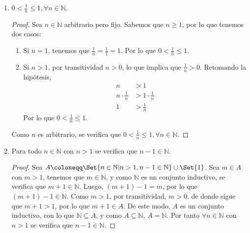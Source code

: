 \documentclass[11pt]{article}
\newcommand{\N}{\mathbb{N}}
\newcommand{\R}{\mathbb{R}}
\newcommand{\bfit}[1]{\textbf{\textit{#1}}}
\let\emptyset\varnothing
\let\set\Set
\let\union\cup
\begin{document}
\begin{enumerate}[label=\alph*)]
\begin{proof}
        Si $n\in A$ debe ser el caso que $n\in \N$ y $1\leq n$. Además, por la cerradura de la suma en $\N$, $n+1\in \N$. Luego, $0 \leq 1$ de donde sigue que $n \leq n+1$. Por transitividad, $1\leq n+1$, por lo que $n+1\in A$, lo que implica que $A$ es un conjunto inductivo, es decir, $\N\subseteq A$ y como $A\subseteq \N$, $A=N$. En otras palabras, $n\geq 1, \forall n\in\N$.
    \end{proof} \vspace{-1em}

    \bfit{Definición:}  Sea $A\subseteq \R$ con $A \neq \emptyset$, decimos que $m$ es elemento mínimo de $A$ si $m\in A$ y $m\leq a, \forall a\in A$.

    \item $0<\frac{1}{n}\leq 1, \forall n\in \N$.
    \vspace{-1em}\begin{proof} 
        Sea $n\in \N$ arbitrario pero fijo. Sabemos que $n\geq 1$, por lo que tenemos dos casos: \begin{enumerate}[label=\roman*)]
            \item Si $n=1$, tenemos que $\frac{1}{n}=\frac{1}{1}=1$. Por lo que $0<\frac{1}{n}\leq 1$.
            \item Si $n>1$, por transitividad $n>0$, lo que implica que $\frac{1}{n}>0$. Retomando la hipótesis, \begin{align*}
                n &> 1\\
                n \cdot \frac{1}{n} &> 1\cdot \frac{1}{n}\\
                1 &> \frac{1}{n}
            \end{align*} Por lo que $0<\frac{1}{n}\leq 1$. 
        \end{enumerate} Como $n$ es arbitrario, se verifica que $0<\frac{1}{n}\leq 1, \forall n\in \N$.
    \end{proof} \vspace{-1em}

    \item Para todo $n\in \N$ con $n>1$ se verifica que $n-1\in \N$.
    \vspace{-1em}\begin{proof} 
        Sea $A \coloneqq \set{n\in \N | n>1, n-1\in \N}\union \set{1}$. Sea $m\in A$ con $m>1$, tenemos que $m\in \N$, y como $\N$ es un conjunto inductivo, se verifica que $m+1\in\N$. Luego, $(m+1)-1=m$, por lo que $(m+1)-1\in \N$. Como $m>1$, por transitividad, $m>0$, de donde sigue que $m+1>1$, por lo que $m+1\in A$. De este modo, $A$ es un conjunto inductivo, con lo que $\N \subseteq A$, y como $A\subseteq \N$, $A=\N$. Por tanto $\forall n\in \N$ con $n>1$ se verifica que $n-1\in \N$.
    \end{proof} \vspace{-1em}


\end{enumerate}
\end{document}
